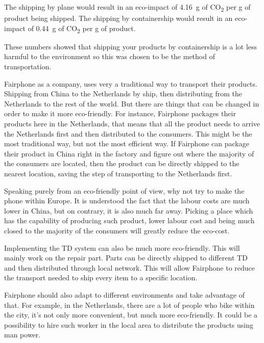 \documentclass[final]{report} %
\begin{document}
The shipping by plane would result in an eco-impact of \SI{4.16}{\gram} of CO\textsubscript{2} per g of product being shipped.
The shipping by containership would result in an eco-impact of \SI{0.44}{\gram} of CO\textsubscript{2} per g of product.

These numbers showed that shipping your products by containership is a lot less harmful to the environment so this was chosen to be the method of transportation.

Fairphone as a company, uses very a traditional way to transport their products. Shipping from China to the Netherlands by ship, then distributing from the Netherlands to the rest of the world. But there are things that can be changed in order to make it more eco-friendly. For instance, Fairphone packages their products here in the Netherlands, that means that all the product needs to arrive the Netherlands first and then distributed to the consumers. This might be the most traditional way, but not the most efficient way. If Fairphone can package their product in China right in the factory and figure out where the majority of the consumers are located, then the product can be directly shipped to the nearest location, saving the step of transporting to the Netherlands first. 

Speaking purely from an eco-friendly point of view, why not try to make the phone within Europe. It is understood the fact that the labour costs are much lower in China, but on contrary, it is also much far away. Picking a place which has the capability of producing such product, lower labour cost and being much closed to the majority of the consumers will greatly reduce the eco-cost. 

Implementing the TD system can also be much more eco-friendly. This will mainly work on the repair part. Parts can be directly shipped to different TD and then distributed through local network. This will allow Fairphone to reduce the transport needed to ship every item to a specific location. 

Fairphone should also adapt to different environments and take advantage of that. For example, in the Netherlands, there are a lot of people who bike within the city, it’s not only more convenient, but much more eco-friendly. It could be a possibility to hire such worker in the local area to distribute the products using man power. 
\end{document}
